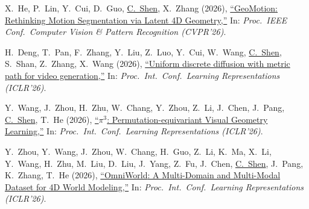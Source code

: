 \documentclass[9pt, a4paper]{article}
\newcommand{\years}[1]{\marginnote{\scriptsize #1}}
\def\highlight{\uline}
\begin{document}
\years{2026} X.~He, P.~Lin, Y.~Cui, D.~Guo, \highlight{C.~Shen}, X.~Zhang (2026),
\href{http://www.google.com/search?lr=&ie=UTF-8&oe=UTF-8&q=GeoMotion%3A+Rethinking+Motion+Segmentation+via+Latent+4D+Geometry+Xiankang+He%2C+Peile+Lin%2C+Ying+Cui%2C+Dongyan+Guo%2C+Chunhua+Shen%2C+Xiaoqin+Zhang}{``{GeoMotion}: Rethinking Motion Segmentation via Latent 4D Geometry,{}''}
In: \emph{Proc.\ IEEE Conf.\  Computer Vision \& Pattern Recognition (CVPR'26)}.

\medskip

\years{2026} H.~Deng, T.~Pan, F.~Zhang, Y.~Liu, Z.~Luo, Y.~Cui, W.~Wang, \highlight{C.~Shen}, S.~Shan, Z.~Zhang, X.~Wang (2026),
\href{http://www.google.com/search?lr=&ie=UTF-8&oe=UTF-8&q=Uniform+discrete+diffusion+with+metric+path+for+video+generation+Haoge+Deng%2C+Ting+Pan%2C+Fan+Zhang%2C+Yang+Liu%2C+Zhuoyan+Luo%2C+Yufeng+Cui%2C+Wenxuan+Wang%2C+Chunhua+Shen%2C+Shiguang+Shan%2C+Zhaoxiang+Zhang%2C+Xinlong+Wang}{``Uniform discrete diffusion with metric path for video generation,{}''}
In: \emph{Proc.\ Int.\ Conf.\  Learning Representations (ICLR'26)}.

\medskip

\years{2026} Y.~Wang, J.~Zhou, H.~Zhu, W.~Chang, Y.~Zhou, Z.~Li, J.~Chen, J.~Pang, \highlight{C.~Shen}, T.~He (2026),
\href{http://www.google.com/search?lr=&ie=UTF-8&oe=UTF-8&q=%3A+Permutation-equivariant+Visual+Geometry+Learning+Yifan+Wang%2C+Jianjun+Zhou%2C+Haoyi+Zhu%2C+Wenzheng+Chang%2C+Yang+Zhou%2C+Zizun+Li%2C+Junyi+Chen%2C+Jiangmiao+Pang%2C+Chunhua+Shen%2C+Tong+He}{``$\pi^3$: Permutation-equivariant Visual Geometry Learning,{}''}
In: \emph{Proc.\ Int.\ Conf.\  Learning Representations (ICLR'26)}.

\medskip

\years{2026} Y.~Zhou, Y.~Wang, J.~Zhou, W.~Chang, H.~Guo, Z.~Li, K.~Ma, X.~Li, Y.~Wang, H.~Zhu, M.~Liu, D.~Liu, J.~Yang, Z.~Fu, J.~Chen, \highlight{C.~Shen}, J.~Pang, K.~Zhang, T.~He (2026),
\href{http://www.google.com/search?lr=&ie=UTF-8&oe=UTF-8&q=OmniWorld%3A+A+Multi-Domain+and+Multi-Modal+Dataset+for+4D+World+Modeling+Yang+Zhou%2C+Yifan+Wang%2C+Jianjun+Zhou%2C+Wenzheng+Chang%2C+Haoyu+Guo%2C+Zizun+Li%2C+Kaijing+Ma%2C+Xinyue+Li%2C+Yating+Wang%2C+Haoyi+Zhu%2C+Mingyu+Liu%2C+Dingning+Liu%2C+Jiange+Yang%2C+Zhoujie+Fu%2C+Junyi+Chen%2C+Chunhua+Shen%2C+Jiangmiao+Pang%2C+Kaipeng+Zhang%2C+Tong+He}{``{OmniWorld}: A Multi-Domain and Multi-Modal Dataset for 4D World Modeling,{}''}
In: \emph{Proc.\ Int.\ Conf.\  Learning Representations (ICLR'26)}.

\medskip
\end{document}
